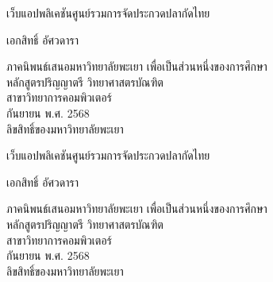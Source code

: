
\clearpage
\thispagestyle{empty}
\begingroup
\fontsize{16pt}{19.2pt}\selectfont %
\bfseries

\noindent
\begin{minipage}[t]{\textwidth}
	\centering
	เว็บแอปพลิเคชันศูนย์รวมการจัดประกวดปลากัดไทย
\end{minipage}

\vspace*{\fill}
\begin{center}
	เอกสิทธิ์ อัศวดารา
\end{center}

\vspace*{\fill}
\noindent
\begin{minipage}[b]{\textwidth}
	\centering
	ภาคนิพนธ์เสนอมหาวิทยาลัยพะเยา เพื่อเป็นส่วนหนึ่งของการศึกษา\\
	หลักสูตรปริญญาตรี วิทยาศาสตรบัณฑิต\\
	สาขาวิทยาการคอมพิวเตอร์\\
	กันยายน พ.ศ. 2568\\
	ลิขสิทธิ์ของมหาวิทยาลัยพะเยา
\end{minipage}
\par
\endgroup
\clearpage

\thispagestyle{empty}\null\clearpage

\thispagestyle{empty}
\begingroup

\noindent
\begin{minipage}[t]{\textwidth}
	\centering
	เว็บแอปพลิเคชันศูนย์รวมการจัดประกวดปลากัดไทย
\end{minipage}

\vspace*{\fill}
\begin{center}
	เอกสิทธิ์ อัศวดารา
\end{center}

\vspace*{\fill}
\noindent
\begin{minipage}[b]{\textwidth}
	\centering
	ภาคนิพนธ์เสนอมหาวิทยาลัยพะเยา เพื่อเป็นส่วนหนึ่งของการศึกษา\\
	หลักสูตรปริญญาตรี วิทยาศาสตรบัณฑิต\\
	สาขาวิทยาการคอมพิวเตอร์\\
	กันยายน พ.ศ. 2568\\
	ลิขสิทธิ์ของมหาวิทยาลัยพะเยา
\end{minipage}

